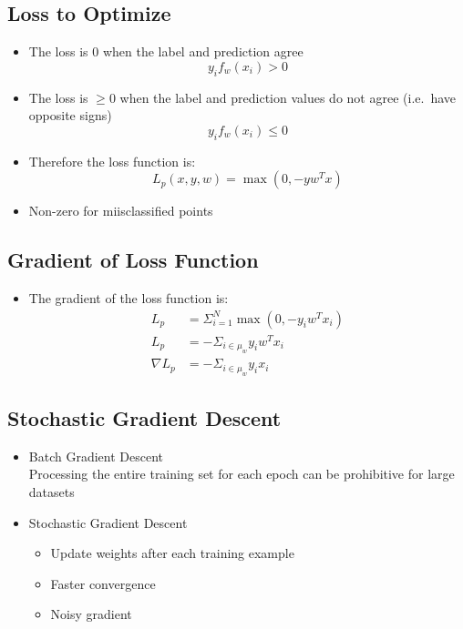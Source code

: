 \documentclass[12pt]{article}
\begin{document}
        \subsection{Loss to Optimize}
            \begin{itemize}
                \item The loss is $0$ when the label and prediction agree
                \begin{equation}
                    y_i{f_w(x_i)} > 0
                \end{equation}
                \item The loss is $\ge 0$ when the label and prediction values do not agree (i.e.\ have opposite signs)
                \begin{equation}
                    y_i{f_w(x_i)} \le 0
                \end{equation}
                \item Therefore the loss function is:
                \begin{equation}
                    L_p(x, y, w) = \max(0, -y{w^T}x)
                \end{equation}
                \item Non-zero for miisclassified points
            \end{itemize}
        \subsection{Gradient of Loss Function}
            \begin{itemize}
                \item The gradient of the loss function is:
                \begin{align*}
                    L_p &= \Sigma_{i=1}^N \max(0, -y_i{w^T}x_i) \\
                    L_p &= -\Sigma_{i \in{}\mu_w} y_i{w^T{x_i}} \\
                    \nabla{}L_p &= -\Sigma_{i \in{}\mu_w} y_i{x_i}
                \end{align*}
            \end{itemize}
        \subsection{Stochastic Gradient Descent}
            \begin{itemize}
                \item Batch Gradient Descent \\
                Processing the entire training set for each epoch can be prohibitive for large datasets
                \item Stochastic Gradient Descent
                \begin{itemize}
                    \item Update weights after each training example
                    \item Faster convergence
                    \item Noisy gradient
                \end{itemize}

            \end{itemize}
\end{document}
